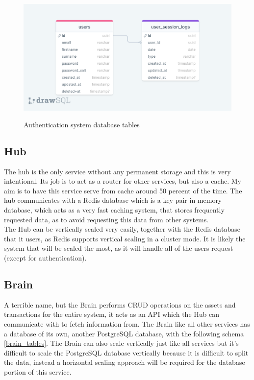 \documentclass[titlepage]{article}
\begin{document}
\begin{figure}
\includegraphics[width=1\textwidth]{auth_diagram.png}
  \label{auth_tables}
  \caption{Authentication system database tables}
\centering
\end{figure}

\subsection{Hub}
The hub is the only service without any permanent storage and this is very intentional. Its job is to act as a router for other services, but also a cache. My aim is to have this service serve from cache around 50 percent of the time. The hub communicates with a Redis database which is a key pair in-memory database, which acts as a very fast caching system, that stores frequently requested data, as to avoid requesting this data from other systems. \\

The Hub can be vertically scaled very easily, together with the Redis database that it users, as Redis supports vertical scaling in a cluster mode. It is likely the system that will be scaled the most, as it will handle all of the users request (except for authentication).

\subsection{Brain}
A terrible name, but the Brain performs CRUD operations on the assets and transactions for the entire system, it acts as an API which the Hub can communicate with to fetch information from. The Brain like all other services has a database of its own, another PostgreSQL database, with the following schema \ref{brain_tables}. The Brain can also scale vertically just like all services but it's difficult to scale the PostgreSQL database vertically because it is difficult to split the data, instead a horizontal scaling approach will be required for the database portion of this service. \\
\end{document}
